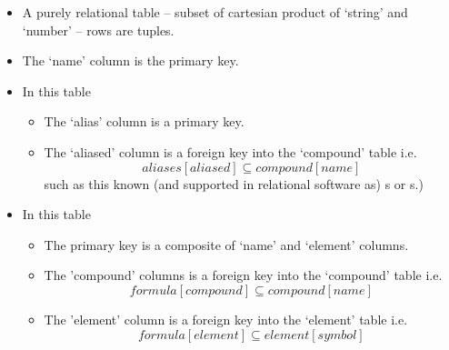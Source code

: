 \begin{frame}
\begin{center}
\scalebox{0.75}{

}
\end{center}
\begin{itemize}
	\item A purely relational table -- subset of cartesian product of `string' and `number' --  rows are tuples.  
	\item The `name' column is the primary key. 
\end{itemize}
\end{frame}
\begin{frame}
\begin{center}
\scalebox{0.75}{

}
\end{center}
\begin{itemize}
\item	In this table
\begin{itemize}
	\item The `alias' column is a primary key.
	\item The `aliased' column is a foreign key into the `compound' table i.e.
	\begin{equation}
	               aliases[aliased] \subseteq compound[name] 
	\end{equation}
	such as this known (and supported in relational software as) s or s.) 
\end{itemize}
\end{itemize}
\end{frame}
\begin{frame}
\begin{center}
\scalebox{0.75}{

}
\end{center}
\begin{itemize}
	\item In this table 
	\begin{itemize}
	\item The primary key is a composite of `name' and `element' columns.  
	\item The 'compound' columns is a foreign key into the `compound' table i.e.
	\begin{equation}
	              formula[compound] \subseteq compound[name]
	\end{equation}
	\item The 'element' column is a foreign key into the `element' table i.e.
	\begin{equation}
	              formula[element] \subseteq element[symbol]
	\end{equation}
    \end{itemize}
\end{itemize}
\end{frame}


